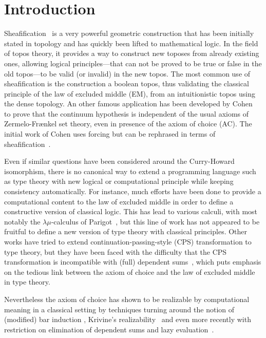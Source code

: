 \documentclass[conference]{IEEEtran}
\begin{document}

\section{Introduction}
\label{sec:intro}

Sheafification~\cite{maclanemoerdijk} is a very powerful geometric
construction that has been initially stated in topology and has
quickly been lifted to mathematical logic.
%
In the field of topos theory, it provides a way to construct new toposes
from already existing ones, allowing logical principles---that can not
be proved to be true or false in the old topos---to be valid (or
invalid) in the new topos.
%
The most common use of sheafification is the construction a boolean
topos, thus validating the classical principle of the law of excluded
middle (EM), from an intuitionistic topos using the dense topology. 
%
An other famous application has been developed by
Cohen~\cite{cohen1966} to prove that the continuum hypothesis is
independent of the usual axioms of Zermelo-Fr\ae nkel set theory, even
in presence of the axiom of choice (AC). The initial work of Cohen
uses forcing but can be rephrased in terms of
sheafification~\cite{maclanemoerdijk}.

Even if similar questions have been considered around the Curry-Howard
isomorphism, there is no canonical way to extend a programming
language such as type theory with new logical or computational
principle while keeping consistency automatically.
%
For instance, much efforts have been done to provide a computational
content to the law of excluded middle in order to define a
constructive version of classical logic. This has lead to various
calculi, with most notably the $\lambda \mu$-calculus of
Parigot~\cite{parigot1993classical}, but this line of work has not
appeared to be fruitful to define a new version of type theory with
classical principles.
%
Other works have tried to extend continuation-passing-style (CPS)
transformation to type theory, but they have been faced with the
difficulty that the CPS transformation is incompatible with (full) dependent
sums~\cite{barthe2002cps}, which puts emphasis on the tedious link
between the axiom of choice and the law of excluded middle in type theory.

Nevertheless the axiom of choice has shown to be realizable by
computational meaning in a classical setting by techniques turning
around the notion of (modified) bar induction
\cite{berardi1998computational}, Krivine's
realizability~\cite{krivine2003dependent} and even more recently with
restriction on elimination of dependent sums and lazy
evaluation~\cite{herbelin2012constructive}.
%
\end{document}
